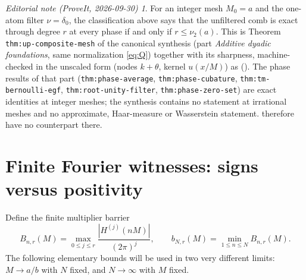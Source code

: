 \documentclass[11pt,a4paper]{article}
\numberwithin{equation}{section}
\theoremstyle{plain}
\theoremstyle{definition}
\theoremstyle{remark}
\newtheorem*{ednote}{Editorial note (ProveIt, 2026-09-30)}
\begin{document}
\begin{ednote}
For an integer mesh $M_0=a$ and the one-atom filter $\nu=\delta_0$, the
classification above says that the unfiltered comb is exact through degree
$r$ at every phase if and only if $r\le\nu_2(a)$. This is Theorem
\texttt{thm:up-composite-mesh} of the canonical synthesis
(part \emph{Additive dyadic foundations}, same normalization
\eqref{eq:Q}) together with its sharpness, machine-checked in the unscaled
form (nodes $k+\theta$, kernel $u(x/M)$) as
().
The phase results of that part (\texttt{thm:phase-average},
\texttt{thm:phase-cubature}, \texttt{thm:tm-bernoulli-egf},
\texttt{thm:root-unity-filter}, \texttt{thm:phase-zero-set}) are exact
identities at integer meshes; the synthesis contains no statement at
irrational meshes and no approximate, Haar-measure or Wasserstein statement.
therefore have no counterpart there.
\end{ednote}

\section{Finite Fourier witnesses: signs versus positivity}
\label{sec:witnesses}

Define the finite multiplier barrier
\begin{equation}\label{eq:barrier}
 B_{n,r}(M)=\max_{0\le j\le r}
 \frac{|H^{(j)}(nM)|}{(2\pi)^j},
 \qquad b_{N,r}(M)=\min_{1\le n\le N}B_{n,r}(M).
\end{equation}
The following elementary bounds will be used in two very different limits:
$M\to a/b$ with $N$ fixed, and $N\to\infty$ with $M$ fixed.
\end{document}
